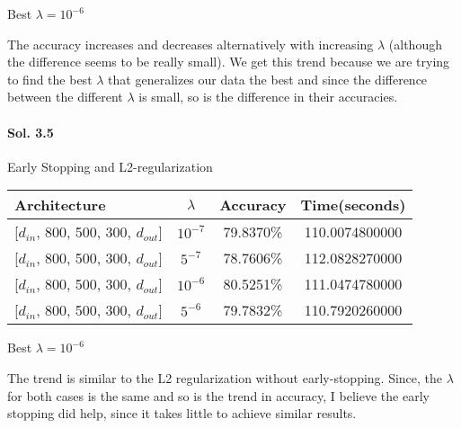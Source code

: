 \documentclass[]{report}
\begin{document}
	Best $\lambda = 10^{-6}$

	The accuracy increases and decreases alternatively with increasing $\lambda$ (although the difference seems to be really small). We get this trend because we are trying to find the best $\lambda$ that generalizes our data the best and since the difference between the different $\lambda$ is small, so is the difference in their accuracies.

\paragraph{Sol. 3.5}
	Early Stopping and L2-regularization
	\begin{center}
	\begin{tabular}{l|c|c|c}
		\hline
		 Architecture                   &       $\lambda$ & Accuracy   &   Time(seconds) \\
		\hline
		 {[$d_{in}$, 800, 500, 300, $d_{out}$]} & $10^{-7}$ & 79.8370\%   &  110.0074800000 \\
		 {[$d_{in}$, 800, 500, 300, $d_{out}$]} & $5^{-7} $ & 78.7606\%   &  112.0828270000 \\
		 {[$d_{in}$, 800, 500, 300, $d_{out}$]} & $10^{-6}$ & 80.5251\%   &  111.0474780000 \\
		 {[$d_{in}$, 800, 500, 300, $d_{out}$]} & $5^{-6} $ & 79.7832\%   &  110.7920260000 \\
		\hline
		\end{tabular}
	\end{center}
	Best $\lambda = 10^{-6}$

	The trend is similar to the L2 regularization without early-stopping. Since, the $\lambda$ for both cases is the same and so is the trend in accuracy, I believe the early stopping did help, since it takes little to achieve similar results.
\end{document}
